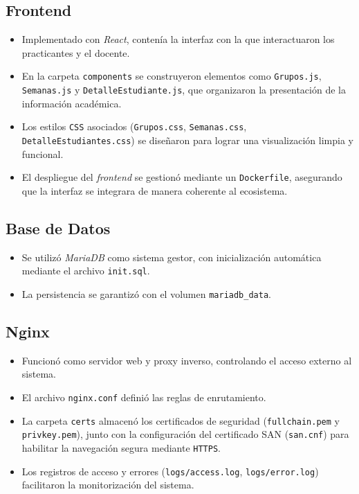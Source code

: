 \documentclass[letter,oneside,12pt,spanish]{report}
\begin{document}
\subsection{Frontend}
\begin{itemize}
    \item Implementado con \textit{React}, contenía la interfaz con la que interactuaron los practicantes y el docente.
    \item En la carpeta \texttt{components} se construyeron elementos como \texttt{Grupos.js}, \texttt{Semanas.js} y \texttt{DetalleEstudiante.js}, que organizaron la presentación de la información académica.
    \item Los estilos \texttt{CSS} asociados (\texttt{Grupos.css}, \texttt{Semanas.css}, \texttt{DetalleEstudiantes.css}) se diseñaron para lograr una visualización limpia y funcional.
    \item El despliegue del \textit{frontend} se gestionó mediante un \texttt{Dockerfile}, asegurando que la interfaz se integrara de manera coherente al ecosistema.
\end{itemize}

\subsection{Base de Datos}
\begin{itemize}
    \item Se utilizó \textit{MariaDB} como sistema gestor, con inicialización automática mediante el archivo \texttt{init.sql}.
    \item La persistencia se garantizó con el volumen \texttt{mariadb\_data}.
\end{itemize}

\subsection{Nginx}
\begin{itemize}
    \item Funcionó como servidor web y proxy inverso, controlando el acceso externo al sistema.
    \item El archivo \texttt{nginx.conf} definió las reglas de enrutamiento.
    \item La carpeta \texttt{certs} almacenó los certificados de seguridad (\texttt{fullchain.pem} y \texttt{privkey.pem}), junto con la configuración del certificado SAN (\texttt{san.cnf}) para habilitar la navegación segura mediante \texttt{HTTPS}.
    \item Los registros de acceso y errores (\texttt{logs/access.log}, \texttt{logs/error.log}) facilitaron la monitorización del sistema.
\end{itemize}
\end{document}

